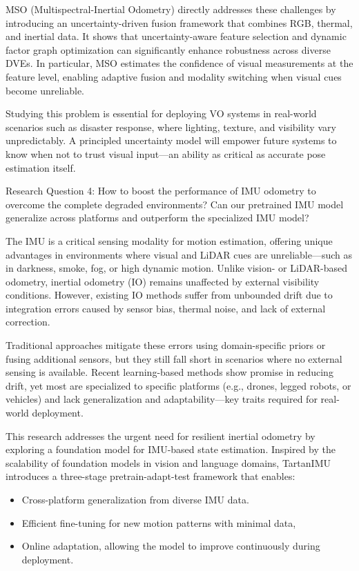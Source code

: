 MSO (Multispectral-Inertial Odometry) directly addresses these challenges by introducing an uncertainty-driven fusion framework that combines RGB, thermal, and inertial data. It shows that uncertainty-aware feature selection and dynamic factor graph optimization can significantly enhance robustness across diverse DVEs. In particular, MSO estimates the confidence of visual measurements at the feature level, enabling adaptive fusion and modality switching when visual cues become unreliable.

Studying this problem is essential for deploying VO systems in real-world scenarios such as disaster response, where lighting, texture, and visibility vary unpredictably. A principled uncertainty model will empower future systems to know when not to trust visual input—an ability as critical as accurate pose estimation itself.




\begin{framed}
Research Question 4: How to boost the performance of IMU odometry to overcome the complete degraded environments? Can our pretrained IMU model generalize across platforms and outperform the specialized IMU model? 
\end{framed}

The IMU is a critical sensing modality for motion estimation, offering unique advantages in environments where visual and LiDAR cues are unreliable—such as in darkness, smoke, fog, or high dynamic motion. Unlike vision- or LiDAR-based odometry, inertial odometry (IO) remains unaffected by external visibility conditions. However, existing IO methods suffer from unbounded drift due to integration errors caused by sensor bias, thermal noise, and lack of external correction.

Traditional approaches mitigate these errors using domain-specific priors or fusing additional sensors, but they still fall short in scenarios where no external sensing is available. Recent learning-based methods show promise in reducing drift, yet most are specialized to specific platforms (e.g., drones, legged robots, or vehicles) and lack generalization and adaptability—key traits required for real-world deployment.

This research addresses the urgent need for resilient inertial odometry by exploring a foundation model for IMU-based state estimation. Inspired by the scalability of foundation models in vision and language domains, TartanIMU introduces a three-stage pretrain-adapt-test framework that enables:
\begin{itemize}
    \item Cross-platform generalization from diverse IMU data. 
    \item Efficient fine-tuning for new motion patterns with minimal data,
    \item Online adaptation, allowing the model to improve continuously during deployment.
\end{itemize}


